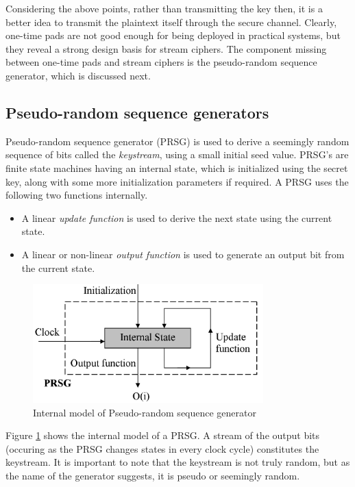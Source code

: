 Considering the above points, rather than transmitting the key then, it is a better idea to transmit the plaintext itself through the secure channel. Clearly, one-time pads are not good enough for being deployed in practical systems, but they reveal a strong design basis for stream ciphers. The component missing between one-time pads and stream ciphers is the pseudo-random sequence generator, which is discussed next. 


\subsection{Pseudo-random sequence generators}
\label{sec:psrg}

Pseudo-random sequence generator (PRSG) is used to derive a seemingly random sequence of bits called the \emph{keystream}, using a small initial seed value. PRSG's are finite state machines having an internal state, which is initialized using the secret key, along with some more initialization parameters if required. A PRSG uses the following two functions internally.
\begin{itemize}
\item A linear \emph{update function} is used to derive the next state using the current state.
\item A linear or non-linear \emph{output function} is used to generate an output bit from the current state. 
\end{itemize}

\begin{figure}[ht!]
	\centering
		\includegraphics[width=3.5in]{./figures/prsg.PNG}
	\caption{Internal model of Pseudo-random sequence generator}	
	\label{fig:prsg}
\end{figure}

Figure \ref{fig:prsg} shows the internal model of a PRSG. A stream of the output bits (occuring as the PRSG changes states in every clock cycle) constitutes the keystream. It is important to note that the keystream is not truly random, but as the name of the generator suggests, it is pseudo or seemingly random. 


